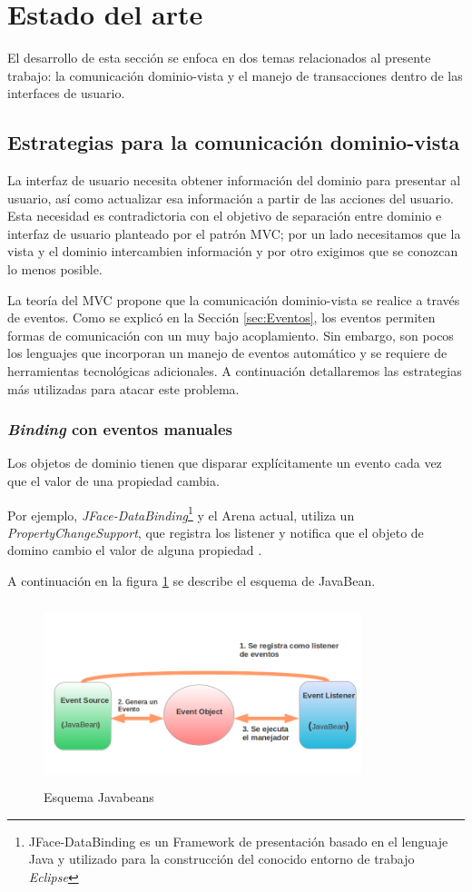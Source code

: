 \section{Estado del arte}
\label{sec:StateOfTheArt}
El desarrollo de esta sección se enfoca en dos temas relacionados al
presente trabajo: la comunicación dominio-vista y el manejo de transacciones
dentro de las interfaces de usuario.

\subsection{Estrategias para la comunicación dominio-vista}
La interfaz de usuario necesita obtener información del dominio para presentar
al usuario, así como actualizar esa información a partir de las acciones del usuario.
Esta necesidad es contradictoria con el  objetivo de separación entre dominio e
interfaz de usuario planteado por el patrón MVC; por un lado necesitamos que la
vista y el dominio intercambien información y por otro exigimos que se conozcan
lo menos posible.

La teoría del MVC propone que la comunicación dominio-vista se realice a través
de eventos. Como se explicó en la Sección \ref{sec:Eventos}, los eventos
permiten formas de comunicación con un muy bajo acoplamiento. Sin embargo, son
pocos los lenguajes que incorporan un manejo de eventos automático y se requiere
de herramientas tecnológicas adicionales. A continuación detallaremos las
estrategias más utilizadas para atacar este problema.


	\subsubsection{\emph{Binding} con eventos manuales}
		Los objetos de dominio tienen que disparar
		explícitamente un evento cada vez que el valor de una propiedad cambia.
			
		Por ejemplo, \emph{JFace-DataBinding}\footnote{JFace-DataBinding es un
		Framework de presentación basado en el lenguaje Java y utilizado para la
		construcción del conocido entorno de trabajo \emph{Eclipse}} y el Arena
		actual, utiliza un \emph{PropertyChangeSupport}, que registra los listener y notifica que el objeto de domino cambio el valor de alguna propiedad \cite{sousa00formal}.
		
		A continuación en la figura \ref{javabeans} se describe el esquema de
		JavaBean.
		
		 \begin{figure}[h]
			\includegraphics[width=350px, height=200px]{img/javabeans}
			\caption{Esquema Javabeans}
			\label{javabeans}
		\end{figure}
	


